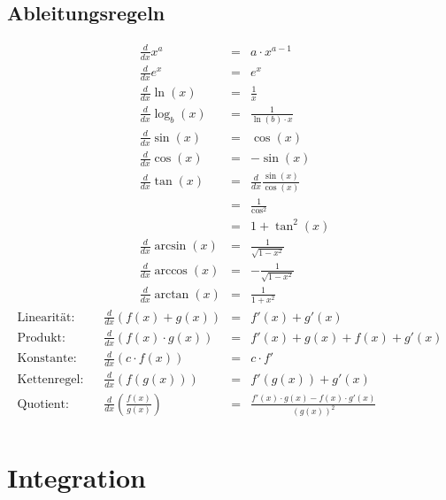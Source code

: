 \documentclass[../Main.tex]{subfiles}
\begin{document}
\subsection{Ableitungsregeln}
\begin{equation}
    \begin{aligned}
        &\frac{d}{dx}x^a         &= &a \cdot x^{a-1} \\
        &\frac{d}{dx}e^x         &= &e^x \\
        &\frac{d}{dx}\ln(x)      &= &\frac{1}{x} \\
        &\frac{d}{dx}\log_b(x)   &= &\frac{1}{\ln(b) \cdot x} \\
        &\frac{d}{dx}\sin(x)     &= &\cos(x) \\
        &\frac{d}{dx}\cos(x)     &= &-\sin(x) \\
        &\frac{d}{dx}\tan(x)     &= &\frac{d}{dx}\frac{\sin(x)}{\cos(x)}  \\
         &&= &\frac{1}{\cos^2} \\
         &&= &1 + \tan^2(x) \\
        &\frac{d}{dx}\arcsin(x)  &= &\frac{1}{\sqrt{1-x^2}} \\
        &\frac{d}{dx}\arccos(x)  &= &-\frac{1}{\sqrt{1-x^2}} \\
        &\frac{d}{dx}\arctan(x)  &= &\frac{1}{1+x^2}
    \end{aligned}
\end{equation}
\begin{equation}
    \begin{aligned}
        \text{Linearität: }    \enspace    &\frac{d}{dx} (f(x)+g(x))           &= &f'(x)+g'(x) \\
        \text{Produkt: }       \enspace    &\frac{d}{dx} (f(x) \cdot g(x))     &= &f'(x)+g(x) + f(x)+g'(x) \\
        \text{Konstante: }     \enspace    &\frac{d}{dx} (c \cdot f(x))        &= &c \cdot f' \\
        \text{Kettenregel: }   \enspace    &\frac{d}{dx} (f(g(x)))             &= &f'(g(x))+g'(x) \\
        \text{Quotient: }      \enspace    &\frac{d}{dx} (\frac{f(x)}{g(x)})   &= &\frac{f'(x) \cdot g(x) - f(x) \cdot g'(x)}{(g(x))^2} \\
    \end{aligned}
\end{equation}

\section{Integration}
\end{document}
